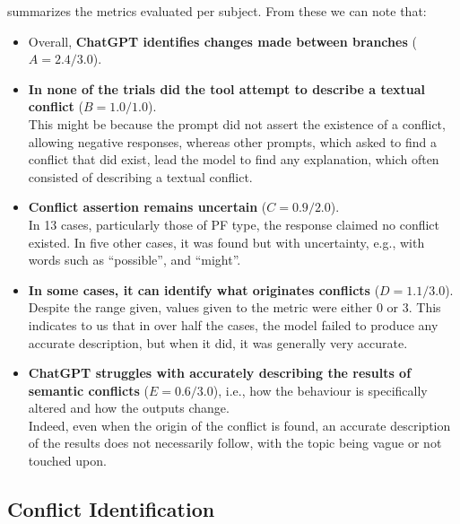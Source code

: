 summarizes the metrics evaluated per subject. From these we can note that:

\begin{itemize}
  \item Overall, \textbf{ChatGPT identifies changes made between branches} ($A=2.4/3.0$).

  \item \textbf{In none of the trials did the tool attempt to describe a textual conflict} ($B=1.0/1.0$). \\
  This might be because the prompt did not assert the existence of a conflict, allowing negative responses, whereas other prompts, which asked to find a conflict that did exist, lead the model to find any explanation, which often consisted of describing a textual conflict.

  \item \textbf{Conflict assertion remains uncertain} ($C=0.9/2.0$). \\
  In 13 cases, particularly those of PF type, the response claimed no conflict existed. In five other cases, it was found but with uncertainty, e.g., with words such as ``possible'', and ``might''.

  \item \textbf{In some cases, it can identify what originates conflicts} ($D=1.1/3.0$).  \\
  Despite the range given, values given to the metric were either 0 or 3. This indicates to us that in over half the cases, the model failed to produce any accurate description, but when it did, it was generally very accurate.

  \item \textbf{ChatGPT struggles with accurately describing the results of semantic conflicts} ($E=0.6/3.0$), i.e., how the behaviour is specifically altered and how the outputs change. \\
  Indeed, even when the origin of the conflict is found, an accurate description of the results does not necessarily follow, with the topic being vague or not touched upon.
\end{itemize}


\subsection{Conflict Identification}

